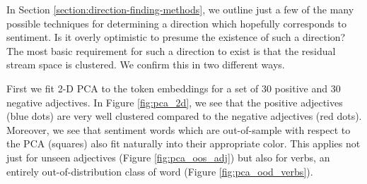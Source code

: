 \documentclass{article} %
\newcommand{\simpleTrainSize}{30 }
\begin{document}
In Section \ref{section:direction-finding-methods}, we outline just a few of the many possible techniques for determining a direction which hopefully corresponds to sentiment. Is it overly optimistic to presume the existence of such a direction? The most basic requirement for such a direction to exist is that the residual stream space is clustered. We confirm this in two different ways.

First we fit 2-D PCA to the token embeddings for a set of \simpleTrainSize positive and \simpleTrainSize negative adjectives. In Figure \ref{fig:pca_2d}, we see that the positive adjectives (blue dots) are very well clustered compared to the negative adjectives (red dots). Moreover, we see that sentiment words which are out-of-sample with respect to the PCA (squares) also fit naturally into their appropriate color. This applies not just for unseen adjectives (Figure \ref{fig:pca_oos_adj}) but also for verbs, an entirely out-of-distribution class of word (Figure \ref{fig:pca_ood_verbs}). 
\end{document}
